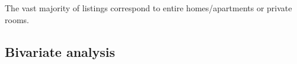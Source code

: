 
The vast majority of listings correspond to entire homes/apartments or private rooms.

\pagebreak
\subsection{Bivariate analysis}%
\label{sub:bivariate_analysis}


